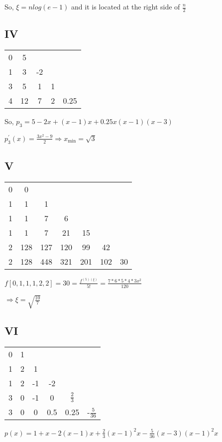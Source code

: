\documentclass[12]{article}%
\begin{document}
            So, $\xi=nlog(e-1)$ and it is located at the right side of $\frac{n}{2}$
        
        \subsection{IV}
        \begin{tabular}{c|c|c|c|c}
            0 & 5  \\
            1 & 3  & -2 \\
            3 & 5  & 1 & 1 \\
            4 & 12 & 7 & 2 & 0.25
        \end{tabular}

            So, $p_3=5-2x+(x-1)x+0.25x(x-1)(x-3)$

            $p_3^{'}(x)=\frac{3x^2-9}{2}\Rightarrow x_{\min}=\sqrt{3}$

        \subsection{V}
        \begin{tabular}{c|c|c|c|c|c|c}
            0 & 0 \\
            1 & 1   & 1 \\
            1 & 1   & 7   & 6 \\
            1 & 1   & 7   & 21  & 15\\
            2 & 128 & 127 & 120 & 99 & 42 \\
            2 & 128 & 448 & 321 & 201 & 102 & 30
        \end{tabular}

        $f[0,1,1,1,2,2]=30=\frac{f^{(5)(\xi)}}{5!}=\frac{7*6*5*4*3x^2}{120}$

        $\Rightarrow \xi=\sqrt{\frac{10}{7}}$
        \subsection{VI}
        \begin{tabular}{c|c|c|c|c|c}
            0 & 1 \\
            1 & 2 & 1 \\
            1 & 2 & -1 & -2 \\
            3 & 0 & -1 & 0   & $\frac{2}{3}$ \\
            3 & 0 & 0  & 0.5 & 0.25 & -$\frac{5}{36}$
        \end{tabular}

        $p(x)=1+x-2(x-1)x+\frac{2}{3}(x-1)^2x-\frac{5}{36}(x-3)(x-1)^2x$
\end{document}
